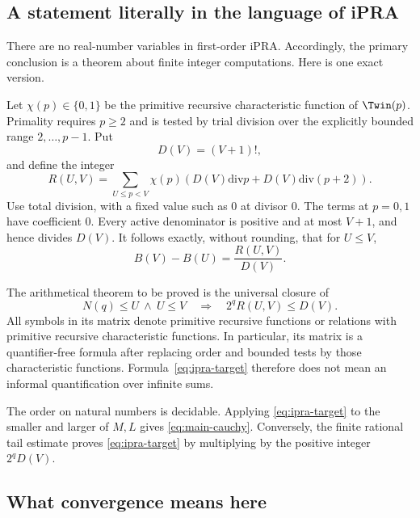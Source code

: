 \subsection{A statement literally in the language of iPRA}

There are no real-number variables in first-order iPRA. Accordingly, the
primary conclusion is a theorem about finite integer computations. Here is
one exact version.

Let \(\chi(p)\in\{0,1\}\) be the primitive recursive characteristic function
of \(\Twin(p)\). Primality requires \(p\ge2\) and is tested by trial division
over the explicitly bounded range \(2,\ldots,p-1\). Put
\[
 D(V)=(V+1)!,
\]
and define the integer
\begin{equation}
 R(U,V)=
 \sum_{U\le p<V}\chi(p)
 \left(D(V)\mathbin{\mathrm{div}}p+
       D(V)\mathbin{\mathrm{div}}(p+2)\right).
 \label{eq:integer-tail}
\end{equation}
Use total division, with a fixed value such as \(0\) at divisor \(0\).
The terms at \(p=0,1\) have coefficient \(0\). Every active denominator is
positive and at most \(V+1\), and hence divides \(D(V)\).
It follows exactly, without rounding, that for \(U\le V\),
\begin{equation}
 B(V)-B(U)=\frac{R(U,V)}{D(V)}.
 \label{eq:tail-code}
\end{equation}

The arithmetical theorem to be proved is the universal closure of
\begin{equation}
 \boxed{\quad
 N(q)\le U\ \wedge\ U\le V
 \quad\Longrightarrow\quad
 2^qR(U,V)\le D(V).
 \quad}
 \label{eq:ipra-target}
\end{equation}
All symbols in its matrix denote primitive recursive functions or
relations with primitive recursive characteristic functions. In particular,
its matrix is a quantifier-free formula after replacing order and bounded
tests by those characteristic functions. Formula~\eqref{eq:ipra-target}
therefore does not mean an informal quantification over infinite sums.

The order on natural numbers is decidable. Applying
\eqref{eq:ipra-target} to the smaller and larger of \(M,L\) gives
\eqref{eq:main-cauchy}. Conversely, the finite rational tail estimate proves
\eqref{eq:ipra-target} by multiplying by the positive integer \(2^qD(V)\).

\subsection{What convergence means here}

